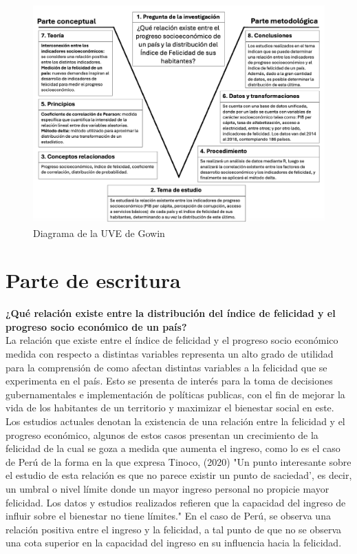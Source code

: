 \documentclass[12pt,oneside,letterpaper,spanish]{article}
\begin{document}
\begin{figure}[H]
        \centering
        \caption{Diagrama de la UVE de Gowin}
        \label{fig1Hora}
        \includegraphics[width = 17cm]{figures/uve_de_gowin.png}
    \end{figure}

\pagebreak

\section{Parte de escritura}
\textbf{¿Qué relación existe entre la distribución del índice de felicidad y el progreso socio económico de un país?} \\

La relación que existe entre el índice de felicidad y el progreso socio económico medida con respecto a distintas variables representa un alto grado de utilidad para la comprensión de como afectan distintas variables a la felicidad que se experimenta en el país. Esto se presenta de interés para la toma de decisiones gubernamentales e implementación de políticas publicas, con el fin de mejorar la vida de los habitantes de un territorio y maximizar el bienestar social en este.\\
    
Los estudios actuales denotan la existencia de una relación entre la felicidad y el progreso económico, algunos de estos casos presentan un crecimiento de la felicidad de la cual se goza a medida que aumenta el ingreso, como lo es el caso de Perú de la forma en la que expresa Tinoco, (2020) "Un punto interesante sobre el estudio de esta relación es que no parece existir un punto de saciedad', es decir, un umbral o nivel límite donde un mayor ingreso personal no propicie mayor felicidad. Los datos y estudios realizados refieren que la capacidad del ingreso de influir sobre el bienestar no tiene límites." En el caso de Perú, se observa una relación positiva entre el ingreso y la felicidad, a tal punto de que no se observa una cota superior en la capacidad del ingreso en su influencia hacia la felicidad.\\
    
\end{document}
